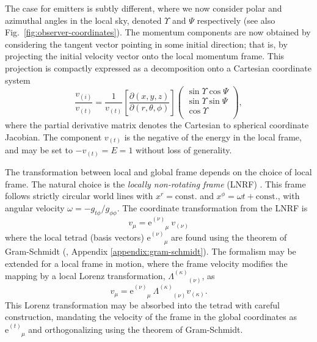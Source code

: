 \documentclass[fleqn,usenatbib]{mnras}
\newcommand{\e}{\text{e}}
\newcommand{\utensor}[3]{#1^{#2}_{\phantom{#2}#3}}
\newcommand{\pderiv}[2]{\frac{\partial #1}{\partial #2}}
\begin{document}
The case for emitters is subtly different, where we now consider polar and
azimuthal angles in the local sky, denoted $\Upsilon$ and $\Psi$ respectively (see
also Fig.~\ref{fig:observer-coordinates}). The momentum components are now
obtained by considering the tangent vector pointing in some initial direction;
that is, by projecting the initial velocity vector onto the local momentum
frame. This projection is compactly expressed as a decomposition onto a
Cartesian coordinate system
\begin{equation}
    \label{eq:local-angle-to-velocity}
    \frac{v_{(i)}}{v_{(t)}} = \frac{1}{v_{(t)}}
    \left[\pderiv{(x, y, z)}{(r, \theta, \phi)}\right]
    \left(
    \begin{matrix}
        \sin \Upsilon \cos \Psi \\
        \sin \Upsilon \sin \Psi \\
        \cos \Upsilon \\
    \end{matrix}
    \right),
\end{equation}
where the partial derivative matrix denotes the Cartesian to spherical
coordinate Jacobian. The component $v_{(t)}$ is the negative of the energy in
the local frame, and may be set to $-v_{(t)}=E=1$ without loss of generality.

The transformation between local and global frame depends on the choice of local
frame. The natural choice is the \emph{locally non-rotating frame} (LNRF)
\citep{bardeen_rotating_1972}. This frame follows strictly
circular world lines with $x^r = \text{const.}$ and $x^\phi = \omega t +
\text{const.}$, with angular velocity $\omega = -g_{t\phi} / g_{\phi\phi}$. The
coordinate transformation from the LNRF is
\begin{equation}
    \label{eq:local-to-global-velocity}
    v_\mu = \e^{(\nu)}_{\phantom{(\nu)}\mu}\  v_{(\nu)}
\end{equation}
where the local tetrad (basis vectors) $\e^{(\nu)}_{\phantom{(\nu)}\mu}$ are found
using the theorem of Gram-Schmidt (\citealp{schmidt_uber_1989}, Appendix
\ref{appendix:gram-schmidt}). The formalism may be extended for a local frame
in motion, where the frame velocity modifies the mapping by a local Lorenz
transformation, $\Lambda^{(\kappa)}_{\phantom{(\kappa)}(\nu)}$, as
\begin{equation}
    v_\mu = \e^{(\nu)}_{\phantom{(\nu)}\mu}\  \Lambda^{(\kappa)}_{\phantom{(a)}(\nu)} v_{(\kappa)}.
\end{equation}
This Lorenz transformation may be absorbed into the tetrad with careful
construction, mandating the velocity of the frame in the global coordinates as
$\utensor{\e}{(t)}{\mu}$ and orthogonalizing using the theorem of Gram-Schmidt.
\end{document}
